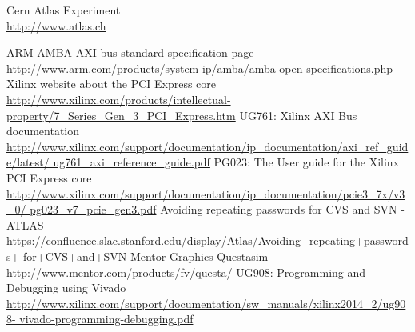 \begin{thebibliography}{9}
  Cern Atlas Experiment\\
  \href{http://www.atlas.ch}{http://www.atlas.ch}

  ARM AMBA AXI bus standard specification page\\
  \href{http://www.arm.com/products/system-ip/amba/amba-open-specifications.php}{http://www.arm.com/products/system-ip/amba/amba-open-specifications.php}
  Xilinx website about the PCI Express core\\
  \href{http://www.xilinx.com/products/intellectual-property/7_Series_Gen_3_PCI_Express.htm}{http://www.xilinx.com/products/intellectual-property/7\_Series\_Gen\_3\_PCI\_Express.htm}
  UG761: Xilinx AXI Bus documentation\\
  \href{http://www.xilinx.com/support/documentation/ip_documentation/axi_ref_guide/latest/ug761_axi_reference_guide.pdf}{http://www.xilinx.com/support/documentation/ip\_documentation/axi\_ref\_guide/latest/ ug761\_axi\_reference\_guide.pdf}
  PG023: The User guide for the Xilinx PCI Express core\\
  \href{http://www.xilinx.com/support/documentation/ip_documentation/pcie3_7x/v3_0/pg023_v7_pcie_gen3.pdf}{http://www.xilinx.com/support/documentation/ip\_documentation/pcie3\_7x/v3\_0/ pg023\_v7\_pcie\_gen3.pdf}
  Avoiding repeating passwords for CVS and SVN - ATLAS\\
  \href{https://confluence.slac.stanford.edu/display/Atlas/Avoiding+repeating+passwords+for+CVS+and+SVN}{https://confluence.slac.stanford.edu/display/Atlas/Avoiding+repeating+passwords+ for+CVS+and+SVN}
  Mentor Graphics Questasim\\
  \href{http://www.mentor.com/products/fv/questa/}{http://www.mentor.com/products/fv/questa/}
  UG908: Programming and Debugging using Vivado\\
  \href{http://www.xilinx.com/support/documentation/sw_manuals/xilinx2014_2/ug908-vivado-programming-debugging.pdf}{http://www.xilinx.com/support/documentation/sw\_manuals/xilinx2014\_2/ug908- vivado-programming-debugging.pdf}
\end{thebibliography}
\newpage
{}
\listoffigures
{}
\listoftables
